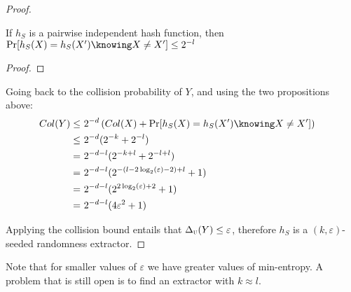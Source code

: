 \begin{proof}
    \begin{proposition}
        If $h_S$ is a pairwise independent hash function, then  $\Pr[h_S(X) = h_S(X') \knowing X \neq X'] \leq 2^{-l}$
    \end{proposition}
    
    \begin{proof}
    \end{proof}

    Going back to the collision probability of $Y$, and using the two propositions above:
    \begin{align*}
        Col(Y) \leq&\ 2^{-d} \left( Col(X) + \Pr[h_S(X) = h_S(X') \knowing X \neq X'] \right) & \\
               \leq&\ 2^{-d} (2^{-k} + 2^{-l}) & \\
                  =&\ 2^{-d - l} (2^{-k + l} + 2^{-l + l}) & \\
                  =&\ 2^{-d - l} (2^{-(l - 2 \log_2(\varepsilon) - 2) + l} + 1)  & \\
                  =&\ 2^{-d - l} (2^{2 \log_2(\varepsilon) + 2} + 1)  & \\
                  =&\ 2^{-d - l} (4\varepsilon^2 + 1) & \\
    \end{align*}

    Applying the collision bound entails that $\Delta_\textsc{u}(Y) \leq \varepsilon$, therefore $h_S$ is a $(k, \varepsilon)$-seeded randomness extractor.
\end{proof}

Note that for smaller values of $\varepsilon$ we have greater values of min-entropy. A problem that is still open is to find an extractor with $k \approx l$.
